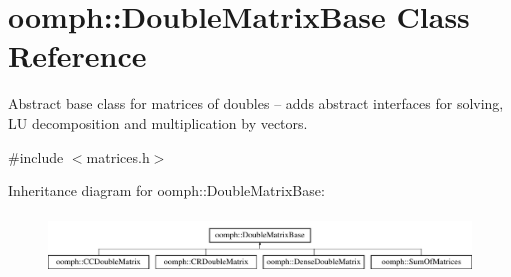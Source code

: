 \hypertarget{classoomph_1_1DoubleMatrixBase}{}\section{oomph\+:\+:Double\+Matrix\+Base Class Reference}
\label{classoomph_1_1DoubleMatrixBase}


Abstract base class for matrices of doubles -- adds abstract interfaces for solving, LU decomposition and multiplication by vectors.  




{\ttfamily \#include $<$matrices.\+h$>$}

Inheritance diagram for oomph\+:\+:Double\+Matrix\+Base\+:\begin{figure}[H]
\begin{center}
\leavevmode
\includegraphics[height=1.609195cm]{classoomph_1_1DoubleMatrixBase}
\end{center}
\end{figure}

